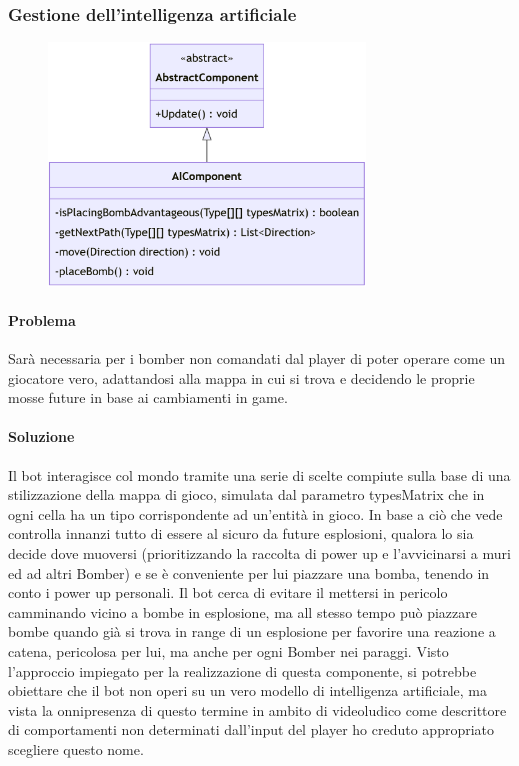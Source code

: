 \documentclass[a4paper,12pt]{report}
\begin{document}
%
\subsubsection*{Gestione dell'intelligenza artificiale}
%
\begin{figure}[H]
    \centering{}
    \includegraphics[width=0.75\textwidth]{img/UMLAI.png}
    \caption{}
    \label{}
\end{figure}
%
\paragraph*{Problema} Sarà necessaria per i bomber non comandati dal player di poter operare come un giocatore vero, adattandosi alla mappa in cui si trova e decidendo le proprie mosse future in base ai cambiamenti in game.
%
\paragraph*{Soluzione}  Il bot interagisce col mondo tramite una serie di scelte compiute sulla base di una stilizzazione della mappa di gioco, simulata dal parametro typesMatrix che in ogni cella ha un tipo corrispondente ad un’entità in gioco.
In base a ciò che vede controlla innanzi tutto di essere al sicuro da future esplosioni, qualora lo sia decide dove muoversi (prioritizzando la raccolta di power up e l’avvicinarsi a muri ed ad altri Bomber) e se è conveniente per lui piazzare una bomba, tenendo in conto i power up personali.
Il bot cerca di evitare il mettersi in pericolo camminando vicino a bombe in esplosione, ma all stesso tempo può piazzare bombe quando già si trova in range di un esplosione per favorire una reazione a catena, pericolosa per lui, ma anche per ogni Bomber nei paraggi.
Visto l’approccio impiegato per la realizzazione di questa componente, si potrebbe obiettare che il bot non operi su un vero modello di intelligenza artificiale, ma vista la onnipresenza di questo termine in ambito di videoludico come descrittore di comportamenti non determinati dall’input del player ho creduto appropriato scegliere questo nome.
\end{document}
